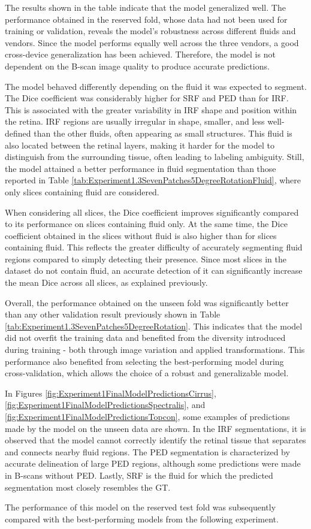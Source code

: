 The results shown in the table indicate that the model generalized well. The performance obtained in the reserved fold, whose data had not been used for training or validation, reveals the model's robustness across different fluids and vendors. Since the model performs equally well across the three vendors, a good cross-device generalization has been achieved. Therefore, the model is not dependent on the B-scan image quality to produce accurate predictions.
\par
The model behaved differently depending on the fluid it was expected to segment. The Dice coefficient was considerably higher for SRF and PED than for IRF. This is associated with the greater variability in IRF shape and position within the retina. IRF regions are usually irregular in shape, smaller, and less well-defined than the other fluids, often appearing as small structures. This fluid is also located between the retinal layers, making it harder for the model to distinguish from the surrounding tissue, often leading to labeling ambiguity. Still, the model attained a better performance in fluid segmentation than those reported in Table \ref{tab:Experiment1.3SevenPatches5DegreeRotationFluid}, where only slices containing fluid are considered.
\par
When considering all slices, the Dice coefficient improves significantly compared to its performance on slices containing fluid only. At the same time, the Dice coefficient obtained in the slices without fluid is also higher than for slices containing fluid. This reflects the greater difficulty of accurately segmenting fluid regions compared to simply detecting their presence. Since most slices in the dataset do not contain fluid, an accurate detection of it can significantly increase the mean Dice across all slices, as explained previously.
\par
Overall, the performance obtained on the unseen fold was significantly better than any other validation result previously shown in Table \ref{tab:Experiment1.3SevenPatches5DegreeRotation}. This indicates that the model did not overfit the training data and benefited from the diversity introduced during training - both through image variation and applied transformations. This performance also benefited from selecting the best-performing model during cross-validation, which allows the choice of a robust and generalizable model. 
\par
In Figures \ref{fig:Experiment1FinalModelPredictionsCirrus}, \ref{fig:Experiment1FinalModelPredictionsSpectralis}, and \ref{fig:Experiment1FinalModelPredictionsTopcon}, some examples of predictions made by the model on the unseen data are shown. In the IRF segmentations, it is observed that the model cannot correctly identify the retinal tissue that separates and connects nearby fluid regions. The PED segmentation is characterized by accurate delineation of large PED regions, although some predictions were made in B-scans without PED. Lastly, SRF is the fluid for which the predicted segmentation most closely resembles the GT.
\par
The performance of this model on the reserved test fold was subsequently compared with the best-performing models from the following experiment.


